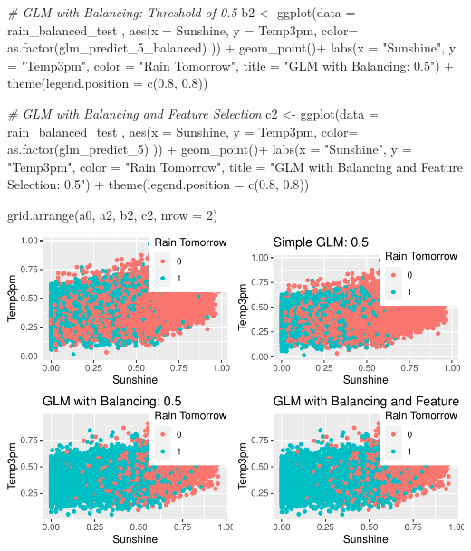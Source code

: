 \documentclass[
]{article}
\newenvironment{Shaded}{\begin{snugshade}}{\end{snugshade}}
\newcommand{\AttributeTok}[1]{\textcolor[rgb]{0.77,0.63,0.00}{#1}}
\newcommand{\CommentTok}[1]{\textcolor[rgb]{0.56,0.35,0.01}{\textit{#1}}}
\newcommand{\DecValTok}[1]{\textcolor[rgb]{0.00,0.00,0.81}{#1}}
\newcommand{\FloatTok}[1]{\textcolor[rgb]{0.00,0.00,0.81}{#1}}
\newcommand{\FunctionTok}[1]{\textcolor[rgb]{0.00,0.00,0.00}{#1}}
\newcommand{\NormalTok}[1]{#1}
\newcommand{\OtherTok}[1]{\textcolor[rgb]{0.56,0.35,0.01}{#1}}
\newcommand{\SpecialCharTok}[1]{\textcolor[rgb]{0.00,0.00,0.00}{#1}}
\newcommand{\StringTok}[1]{\textcolor[rgb]{0.31,0.60,0.02}{#1}}
\begin{document}
\begin{Shaded}
\begin{Highlighting}[]
\CommentTok{\# GLM with Balancing: Threshold of 0.5}
\NormalTok{b2 }\OtherTok{\textless{}{-}} \FunctionTok{ggplot}\NormalTok{(}\AttributeTok{data =}\NormalTok{ rain\_balanced\_test , }\FunctionTok{aes}\NormalTok{(}\AttributeTok{x =}\NormalTok{ Sunshine,}
\AttributeTok{y =}\NormalTok{ Temp3pm,}
\AttributeTok{color=} \FunctionTok{as.factor}\NormalTok{(glm\_predict\_5\_balanced) )) }\SpecialCharTok{+}
\FunctionTok{geom\_point}\NormalTok{()}\SpecialCharTok{+}
\FunctionTok{labs}\NormalTok{(}\AttributeTok{x =} \StringTok{"Sunshine"}\NormalTok{,}
\AttributeTok{y =} \StringTok{"Temp3pm"}\NormalTok{,}
\AttributeTok{color =} \StringTok{"Rain Tomorrow"}\NormalTok{,}
\AttributeTok{title =} \StringTok{"GLM with Balancing: 0.5"}\NormalTok{) }\SpecialCharTok{+}
\FunctionTok{theme}\NormalTok{(}\AttributeTok{legend.position =} \FunctionTok{c}\NormalTok{(}\FloatTok{0.8}\NormalTok{, }\FloatTok{0.8}\NormalTok{))}

\CommentTok{\# GLM with Balancing and Feature Selection}
\NormalTok{c2 }\OtherTok{\textless{}{-}} \FunctionTok{ggplot}\NormalTok{(}\AttributeTok{data =}\NormalTok{ rain\_balanced\_test , }\FunctionTok{aes}\NormalTok{(}\AttributeTok{x =}\NormalTok{ Sunshine,}
\AttributeTok{y =}\NormalTok{ Temp3pm,}
\AttributeTok{color=} \FunctionTok{as.factor}\NormalTok{(glm\_predict\_5) )) }\SpecialCharTok{+}
\FunctionTok{geom\_point}\NormalTok{()}\SpecialCharTok{+}
\FunctionTok{labs}\NormalTok{(}\AttributeTok{x =} \StringTok{"Sunshine"}\NormalTok{,}
\AttributeTok{y =} \StringTok{"Temp3pm"}\NormalTok{,}
\AttributeTok{color =} \StringTok{"Rain Tomorrow"}\NormalTok{,}
\AttributeTok{title =} \StringTok{"GLM with Balancing and Feature Selection: 0.5"}\NormalTok{) }\SpecialCharTok{+}
\FunctionTok{theme}\NormalTok{(}\AttributeTok{legend.position =} \FunctionTok{c}\NormalTok{(}\FloatTok{0.8}\NormalTok{, }\FloatTok{0.8}\NormalTok{))}

\FunctionTok{grid.arrange}\NormalTok{(a0, a2, b2, c2, }\AttributeTok{nrow =} \DecValTok{2}\NormalTok{)}
\end{Highlighting}
\end{Shaded}

\includegraphics{Rain_Australia_files/figure-latex/Visualizing data classifications-1.pdf}
\end{document}
